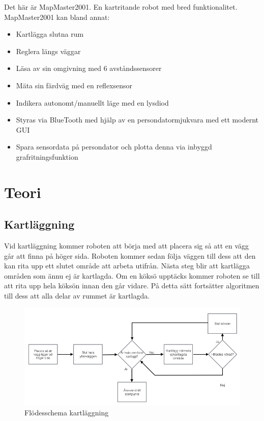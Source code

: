 \documentclass[a4paper,12pt,fleqn]{article}
\begin{document}
Det här är MapMaster2001. En kartritande robot med bred funktionalitet. MapMaster2001 kan bland annat: 

\begin{itemize}
  \item Kartlägga slutna rum
  \item Reglera längs väggar
  \item Läsa av sin omgivning med 6 avståndssensorer
  \item Mäta sin färdväg med en reflexsensor
  \item Indikera autonomt/manuellt läge med en lysdiod
  \item Styras via BlueTooth med hjälp av en persondatormjukvara med ett modernt GUI
  \item Spara sensordata på persondator och plotta denna via inbyggd grafritningsfunktion
\end{itemize}

\newpage
\section{Teori}


\subsection{Kartläggning}

Vid kartläggning kommer roboten att börja med att placera sig så att en vägg går att finna på höger sida. Roboten kommer sedan följa väggen till dess att den kan rita upp ett slutet område att arbeta utifrån. Nästa steg blir att kartlägga områden som ännu ej är kartlagda. Om en köksö upptäcks kommer roboten se till att rita upp hela köksön innan den går vidare. På detta sätt fortsätter algoritmen till dess att alla delar av rummet är kartlagda. 

\begin{figure}[htp] %
  \begin{center}
  \includegraphics[keepaspectratio=true,scale=0.5]{bilder/Flode_kartritning.jpg}  %
  \end{center}
  \caption{Flödesschema kartläggning} %
  \label{fig:fire} %
\end{figure}
\end{document}

